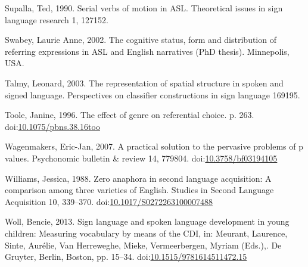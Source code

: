 \documentclass[]{elsarticle} %
\newlength{\cslhangindent}
\newenvironment{CSLReferences}[2] %
 {%
  \setlength{\parindent}{0pt}
  \ifodd #1 \everypar{\setlength{\hangindent}{\cslhangindent}}\ignorespaces\fi
  \ifnum #2 > 0
  \setlength{\parskip}{#2\baselineskip}
  \fi
 }%
 {}
\begin{document}
\begin{CSLReferences}{1}{0}
\leavevmode{}%
Supalla, Ted, 1990. Serial verbs of motion in ASL. Theoretical issues in
sign language research 1, 127152.

\leavevmode{}%
Swabey, Laurie Anne, 2002. The cognitive status, form and distribution
of referring expressions in ASL and English narratives (PhD thesis).
Minnepolis, USA.

\leavevmode{}%
Talmy, Leonard, 2003. The representation of spatial structure in spoken
and signed language. Perspectives on classifier constructions in sign
language 169195.

\leavevmode{}%
Toole, Janine, 1996. The effect of genre on referential choice. p. 263.
doi:\href{https://doi.org/10.1075/pbns.38.16too}{10.1075/pbns.38.16too}

\leavevmode{}%
Wagenmakers, Eric-Jan, 2007. A practical solution to the pervasive
problems of p values. Psychonomic bulletin \& review 14, 779804.
doi:\href{https://doi.org/10.3758/bf03194105}{10.3758/bf03194105}

\leavevmode{}%
Williams, Jessica, 1988. Zero anaphora in second language acquisition: A
comparison among three varieties of English. Studies in Second Language
Acquisition 10, 339--370.
doi:\href{https://doi.org/10.1017/S0272263100007488}{10.1017/S0272263100007488}

\leavevmode{}%
Woll, Bencie, 2013. Sign language and spoken language development in
young children: Measuring vocabulary by means of the CDI, in: Meurant,
Laurence, Sinte, Aurélie, Van Herreweghe, Mieke, Vermeerbergen, Myriam
(Eds.),. De Gruyter, Berlin, Boston, pp. 15--34.
doi:\href{https://doi.org/10.1515/9781614511472.15}{10.1515/9781614511472.15}

\end{CSLReferences}
\end{document}
